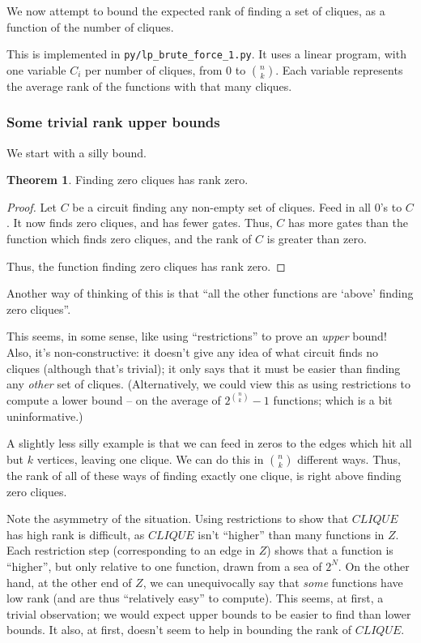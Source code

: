 \documentclass[12pt]{article}
\theoremstyle{definition}
\newtheorem{thm}{Theorem}[section]
\begin{document}
We now attempt to bound the expected rank of finding a set
of cliques, as a function of the number of cliques.

This is implemented in
{\tt py/lp\_brute\_force\_1.py}. It uses a linear program, with
one variable $C_i$ per number of cliques, from 0 to ${n \choose k}$.
Each variable represents the average rank of the functions with
that many cliques.

\subsubsection{Some trivial rank upper bounds}

We start with a silly bound.

\begin{thm}
\label{zeroCliques}
Finding zero cliques has rank zero.
\end{thm}
\begin{proof}

Let $C$ be a circuit finding any non-empty set of cliques.
Feed in all 0's to $C$. It now finds zero cliques, and has
fewer gates. Thus, $C$ has more gates than the function
which finds zero cliques, and the rank of $C$ is greater
than zero.

Thus, the function finding zero cliques has rank zero.

\end{proof}
 
Another way of thinking of this is that ``all the other functions
are `above' finding zero cliques''.

This seems, in some sense, like using ``restrictions'' to prove an {\em upper} bound!
Also, it's non-constructive: it doesn't give any idea of what circuit finds no cliques
(although that's trivial); it only says that it must be easier than finding any
{\em other} set of cliques. (Alternatively, we could view this as using restrictions
to compute a lower bound -- on the average of $2^{n \choose k} - 1$ functions; which
is a bit uninformative.)

A slightly less silly example is that we can feed in zeros to 
the edges which hit all but $k$ vertices, leaving one clique.
We can do this in ${n \choose k}$ different ways. Thus, the rank
of all of these ways of finding exactly one clique, is right above
finding zero cliques.

Note the asymmetry of the situation. Using restrictions to show that
$CLIQUE$ has high rank is difficult, as $CLIQUE$ isn't ``higher'' than
many functions in $Z$. Each restriction step (corresponding to an edge in $Z$)
shows that a function is
``higher'', but only relative to one function, drawn from a sea of $2^N$.
On the other hand, at the other end of $Z$, we can unequivocally say
that {\em some} functions have low rank (and are thus
``relatively easy'' to compute).
This seems, at first, a trivial observation; we would expect upper bounds
to be easier to find than lower bounds. It also, at first, doesn't seem
to help in bounding the rank of $CLIQUE$.
\end{document}

